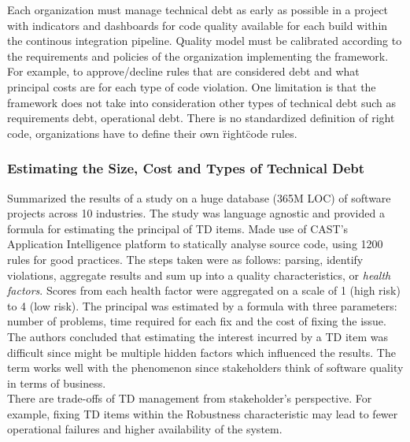 \documentclass{mprop}
\begin{document}
Each organization must manage technical debt as early as possible in a project with indicators and dashboards for code quality available for each build within the continous integration pipeline.
Quality model must be calibrated according to the requirements and policies of the organization implementing the framework. For example, to approve/decline rules that are considered debt and what principal costs are for each type of code violation.
One limitation is that the framework does not take into consideration other types of technical debt such as requirements debt, operational debt.
There is no standardized definition of right code, organizations have to define their own \"right\" code rules.

\subsubsection{Estimating the Size, Cost and Types of Technical Debt} \cite{Curtis2012}
Summarized the results of a study on a huge database (365M LOC) of software projects across 10 industries.
The study was language agnostic and provided a formula for estimating the principal of TD items.
Made use of CAST's Application Intelligence platform to statically analyse source code, using 1200 rules for good practices.
The steps taken were as follows: parsing, identify violations, aggregate results and sum up into a quality characteristics, or \textit{health factors}.
Scores from each health factor were aggregated on a scale of 1 (high risk) to 4 (low risk).
The principal was estimated by a formula with three parameters: number of problems, time required for each fix and the cost of fixing the issue.
The authors concluded that estimating the interest incurred by a TD item was difficult since might be multiple hidden factors which influenced the results.
The term works well with the phenomenon since stakeholders think of software quality in terms of business. \\
There are trade-offs of TD management from stakeholder's perspective.
For example, fixing TD items within the Robustness characteristic may lead to fewer operational failures and higher availability of the system.
\end{document}
